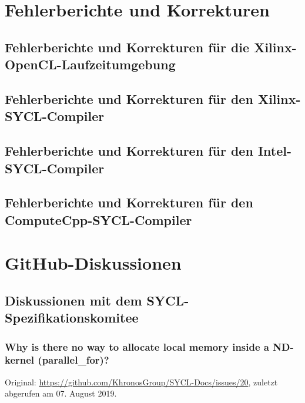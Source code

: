 \chapter{Fehlerberichte und Korrekturen}
\label{anhang:fehler}

\section{Fehlerberichte und Korrekturen für die Xilinx-OpenCL-Laufzeitumgebung}
\label{anhang:fehler:xrt}

\section{Fehlerberichte und Korrekturen für den Xilinx-SYCL-Compiler}
\label{anhang:fehler:xilinx}

\section{Fehlerberichte und Korrekturen für den Intel-SYCL-Compiler}
\label{anhang:fehler:intel}

\section{Fehlerberichte und Korrekturen für den ComputeCpp-SYCL-Compiler}
\label{anhang:fehler:computecpp}

\chapter{GitHub-Diskussionen}
\label{anhang:github}

\section{Diskussionen mit dem SYCL-Spezifikationskomitee}
\label{anhang:github:syclspec}

\subsection{Why is there no way to allocate local memory inside a ND-kernel
            (parallel\_for)?}
\label{anhang:github:syclspec:staticshared}

Original: \url{https://github.com/KhronosGroup/SYCL-Docs/issues/20}, zuletzt
abgerufen am 07. August 2019.


